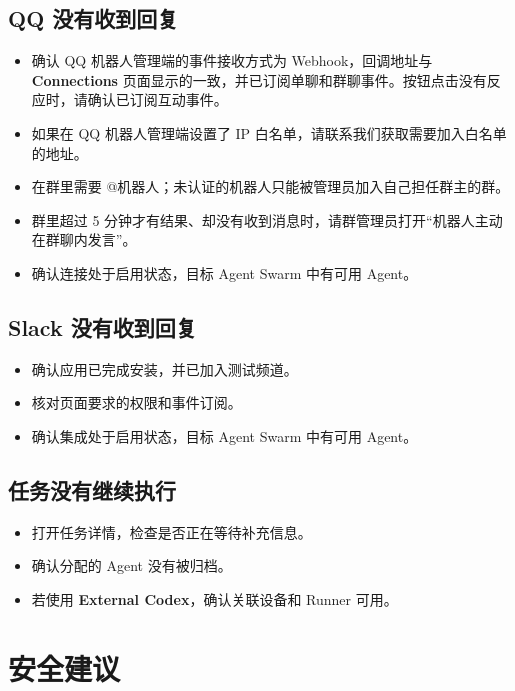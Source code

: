 \documentclass[UTF8,a4paper,11pt]{ctexart}
\begin{document}
\subsection{QQ 没有收到回复}

\begin{itemize}
  \item 确认 QQ 机器人管理端的事件接收方式为 Webhook，回调地址与 \textbf{Connections} 页面显示的一致，并已订阅单聊和群聊事件。按钮点击没有反应时，请确认已订阅互动事件。
  \item 如果在 QQ 机器人管理端设置了 IP 白名单，请联系我们获取需要加入白名单的地址。
  \item 在群里需要 @机器人；未认证的机器人只能被管理员加入自己担任群主的群。
  \item 群里超过 5 分钟才有结果、却没有收到消息时，请群管理员打开“机器人主动在群聊内发言”。
  \item 确认连接处于启用状态，目标 Agent Swarm 中有可用 Agent。
\end{itemize}

\subsection{Slack 没有收到回复}

\begin{itemize}
  \item 确认应用已完成安装，并已加入测试频道。
  \item 核对页面要求的权限和事件订阅。
  \item 确认集成处于启用状态，目标 Agent Swarm 中有可用 Agent。
\end{itemize}

\subsection{任务没有继续执行}

\begin{itemize}
  \item 打开任务详情，检查是否正在等待补充信息。
  \item 确认分配的 Agent 没有被归档。
  \item 若使用 \textbf{External Codex}，确认关联设备和 Runner 可用。
\end{itemize}

\section{安全建议}
\end{document}
